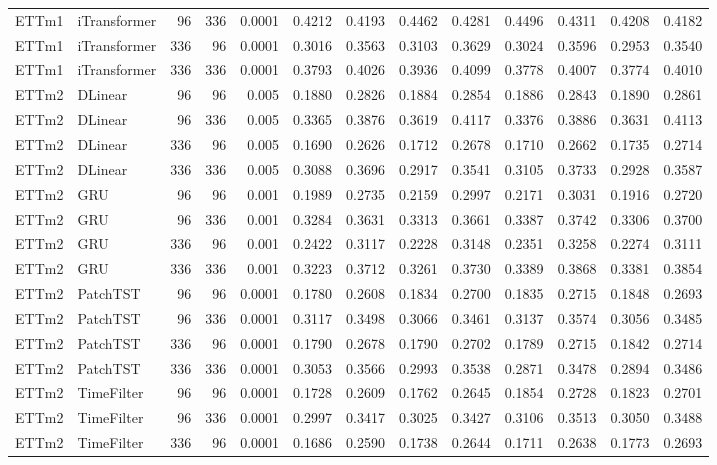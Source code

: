\begin{longtable}{@{}llrrr*{8}{r}@{}}
ETTm1 & iTransformer & 96 & 336 & 0.0001 & 0.4212 & 0.4193 & 0.4462 & 0.4281 & 0.4496 & 0.4311 & 0.4208 & 0.4182 \\
ETTm1 & iTransformer & 336 & 96 & 0.0001 & 0.3016 & 0.3563 & 0.3103 & 0.3629 & 0.3024 & 0.3596 & 0.2953 & 0.3540 \\
ETTm1 & iTransformer & 336 & 336 & 0.0001 & 0.3793 & 0.4026 & 0.3936 & 0.4099 & 0.3778 & 0.4007 & 0.3774 & 0.4010 \\
ETTm2 & DLinear & 96 & 96 & 0.005 & 0.1880 & 0.2826 & 0.1884 & 0.2854 & 0.1886 & 0.2843 & 0.1890 & 0.2861 \\
ETTm2 & DLinear & 96 & 336 & 0.005 & 0.3365 & 0.3876 & 0.3619 & 0.4117 & 0.3376 & 0.3886 & 0.3631 & 0.4113 \\
ETTm2 & DLinear & 336 & 96 & 0.005 & 0.1690 & 0.2626 & 0.1712 & 0.2678 & 0.1710 & 0.2662 & 0.1735 & 0.2714 \\
ETTm2 & DLinear & 336 & 336 & 0.005 & 0.3088 & 0.3696 & 0.2917 & 0.3541 & 0.3105 & 0.3733 & 0.2928 & 0.3587 \\
ETTm2 & GRU & 96 & 96 & 0.001 & 0.1989 & 0.2735 & 0.2159 & 0.2997 & 0.2171 & 0.3031 & 0.1916 & 0.2720 \\
ETTm2 & GRU & 96 & 336 & 0.001 & 0.3284 & 0.3631 & 0.3313 & 0.3661 & 0.3387 & 0.3742 & 0.3306 & 0.3700 \\
ETTm2 & GRU & 336 & 96 & 0.001 & 0.2422 & 0.3117 & 0.2228 & 0.3148 & 0.2351 & 0.3258 & 0.2274 & 0.3111 \\
ETTm2 & GRU & 336 & 336 & 0.001 & 0.3223 & 0.3712 & 0.3261 & 0.3730 & 0.3389 & 0.3868 & 0.3381 & 0.3854 \\
ETTm2 & PatchTST & 96 & 96 & 0.0001 & 0.1780 & 0.2608 & 0.1834 & 0.2700 & 0.1835 & 0.2715 & 0.1848 & 0.2693 \\
ETTm2 & PatchTST & 96 & 336 & 0.0001 & 0.3117 & 0.3498 & 0.3066 & 0.3461 & 0.3137 & 0.3574 & 0.3056 & 0.3485 \\
ETTm2 & PatchTST & 336 & 96 & 0.0001 & 0.1790 & 0.2678 & 0.1790 & 0.2702 & 0.1789 & 0.2715 & 0.1842 & 0.2714 \\
ETTm2 & PatchTST & 336 & 336 & 0.0001 & 0.3053 & 0.3566 & 0.2993 & 0.3538 & 0.2871 & 0.3478 & 0.2894 & 0.3486 \\
ETTm2 & TimeFilter & 96 & 96 & 0.0001 & 0.1728 & 0.2609 & 0.1762 & 0.2645 & 0.1854 & 0.2728 & 0.1823 & 0.2701 \\
ETTm2 & TimeFilter & 96 & 336 & 0.0001 & 0.2997 & 0.3417 & 0.3025 & 0.3427 & 0.3106 & 0.3513 & 0.3050 & 0.3488 \\
ETTm2 & TimeFilter & 336 & 96 & 0.0001 & 0.1686 & 0.2590 & 0.1738 & 0.2644 & 0.1711 & 0.2638 & 0.1773 & 0.2693 \\

\end{longtable}
